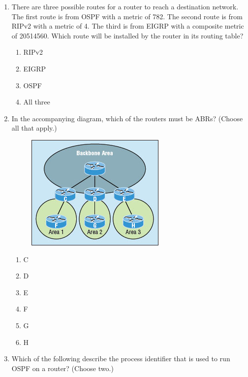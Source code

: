 \begin{enumerate}
\item
  There are three possible routes for a router to reach a destination
  network. The first route is from OSPF with a metric of 782. The second
  route is from RIPv2 with a metric of 4. The third is from EIGRP with a
  composite metric of 20514560. Which route will be installed by the
  router in its routing table?

  \begin{enumerate}
  \def\labelenumii{\Alph{enumii}.}
    \item
    RIPv2
  \item
    EIGRP
  \item
    OSPF
  \item
    All three
  \end{enumerate}
\item
  In the accompanying diagram, which of the routers must be ABRs?
  (Choose all that apply.)

  \begin{figure}
  \centering
      \includegraphics{images/c18f008.jpg}
  \caption{}
  \end{figure}

  \begin{enumerate}
  \def\labelenumii{\Alph{enumii}.}
    \item
    C
  \item
    D
  \item
    E
  \item
    F
  \item
    G
  \item
    H
  \end{enumerate}
\item
  \protect\hypertarget{c18.xhtmlux5cux23Page_777}{}{}Which of the
  following describe the process identifier that is used to run OSPF on
  a router? (Choose two.)


\end{enumerate}
